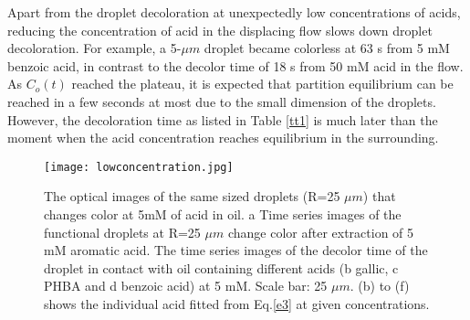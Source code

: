 \documentclass[journal=langd5,manuscript=article]{achemso}
\begin{document}
Apart from the droplet decoloration at unexpectedly low concentrations of acids, reducing the concentration of acid in the displacing flow slows down droplet decoloration. For example, a 5-$\mu m$ droplet became colorless at 63 s from 5 mM benzoic acid, in contrast to the decolor time of 18 s from 50 mM acid in the flow. As $C_o(t)$ reached the plateau, it is expected that partition equilibrium can be reached in a few seconds at most due to the small dimension of the droplets. However, the decoloration time as listed in Table \ref{tt1} is much later than the moment when the acid concentration reaches equilibrium in the surrounding. 
\begin{figure}[htp]
	\texttt{[image: lowconcentration.jpg]}
	\caption{ The optical images of the same sized droplets (R=25 $\mu m$) that changes color at 5mM of acid in oil. a Time series images of the functional droplets at R=25 $\mu m$ change color after extraction of 5 mM aromatic acid. The time series images of the decolor time of the droplet in contact with oil containing different acids (b gallic, c PHBA and d benzoic acid) at 5 mM. Scale bar: 25 $\mu m$. (b) to (f) shows the individual acid fitted from Eq.\ref{e3} at given concentrations. }
	\label{f2}
\end{figure}
\end{document}

